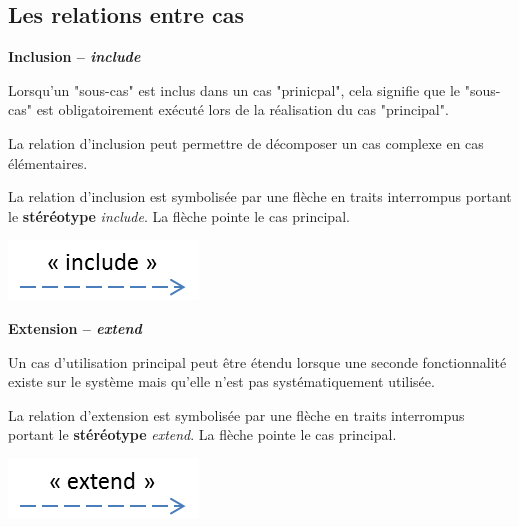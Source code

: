 \documentclass[11pt,oneside]{article}
\begin{document}
\subsection{Les relations entre cas }
\begin{defi}
\textbf{Inclusion -- \textit{include}}

Lorsqu'un "sous-cas" est inclus dans un cas "prinicpal", cela signifie que le "sous-cas" est obligatoirement exécuté lors de la réalisation du cas "principal".

La relation d'inclusion peut permettre de décomposer un cas complexe en cas élémentaires. 

\begin{minipage}[c]{.7\textwidth}
La relation d'inclusion est symbolisée par une flèche en traits interrompus portant le \textbf{stéréotype} \textit{include}. La flèche pointe le cas principal.
\end{minipage}\hfill
\begin{minipage}[c]{.25\textwidth}
\begin{center}
\includegraphics[width=.6\textwidth]{png/include}
\end{center}
\end{minipage}




\end{defi}

\begin{defi}
\textbf{Extension -- \textit{extend}}

Un cas d'utilisation principal peut être étendu lorsque une seconde fonctionnalité existe sur le système mais qu'elle n'est pas systématiquement utilisée.

\begin{minipage}[c]{.7\textwidth}
La relation d'extension est symbolisée par une flèche en traits interrompus portant le \textbf{stéréotype} \textit{extend}. La flèche pointe le cas principal.
\end{minipage}\hfill
\begin{minipage}[c]{.25\textwidth}
\begin{center}
\includegraphics[width=.6\textwidth]{png/extend}
\end{center}
\end{minipage}

\end{defi}
\end{document}

